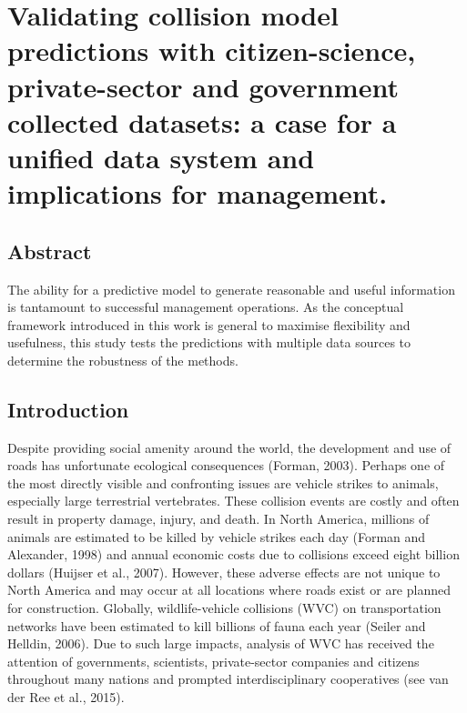 \chapter{Validating collision model predictions with citizen-science, private-sector and government collected datasets: a case for a unified data system and implications for management.}\label{sec:val}
\newpage

\begin{localsize}{10}
\section*{\centering Abstract}

The ability for a predictive model to generate reasonable and useful information is tantamount to successful management operations.  As the conceptual framework introduced in this work is general to maximise flexibility and usefulness, this study tests the predictions with multiple data sources to determine the robustness of the methods.

\end{localsize}

\newpage
\section{Introduction}

Despite providing social amenity around the world, the development and use of roads has unfortunate ecological consequences (Forman, 2003). Perhaps one of the most directly visible and confronting issues are vehicle strikes to animals, especially large terrestrial vertebrates. These collision events are costly and often result in property damage, injury, and death. In North America, millions of animals are estimated to be killed by vehicle strikes each day (Forman and Alexander, 1998) and annual economic costs due to collisions exceed eight billion dollars (Huijser et al., 2007). However, these adverse effects are not unique to North America and may occur at all locations where roads exist or are planned for construction.  Globally, wildlife-vehicle collisions (WVC) on transportation networks have been estimated to kill billions of fauna each year (Seiler and Helldin, 2006). Due to such large impacts, analysis of WVC has received the attention of governments, scientists, private-sector companies and citizens throughout many nations and prompted interdisciplinary cooperatives (see van der Ree et al., 2015).

